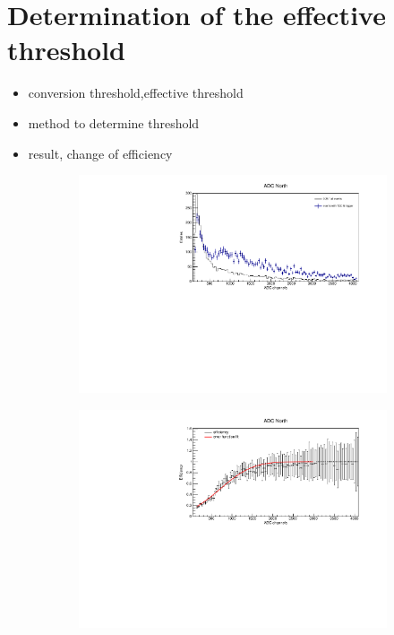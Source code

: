 







\section{Determination of the effective threshold}


\begin{itemize}
  \item conversion threshold,effective threshold
  \item method to determine threshold
  \item result, change of efficiency
\end{itemize}

\begin{figure}[ht]
  \centering
  \begin{subfigure}{0.7\linewidth}
    \includegraphics[width=\linewidth{}]{./fig/M6AdcNorth2Histo.pdf}
    \caption{}
    \label{fig:2HistoM6}
  \end{subfigure}
  \begin{subfigure}{0.7\linewidth}
    \includegraphics[width=\linewidth{}]{./fig/M6AdcNortheff_late.pdf}
    \caption{}
    \label{fig:eff_lateM6}
  \end{subfigure}
\end{figure}
